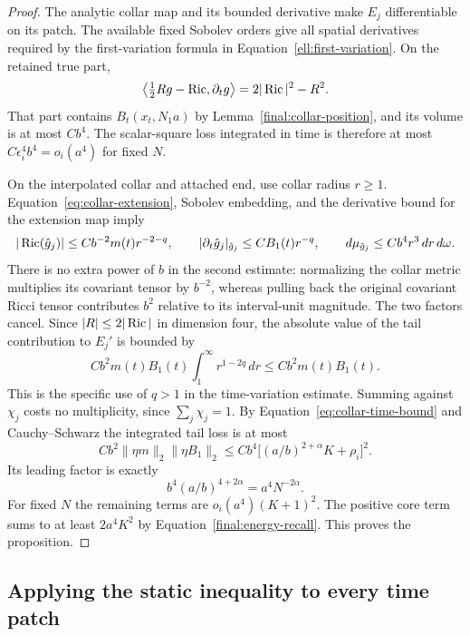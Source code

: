 \begin{proof}
The analytic collar map and its bounded derivative make $E_j$
differentiable on its patch.  The available fixed Sobolev orders
give all spatial derivatives required by the first-variation formula
in Equation~\eqref{ell:first-variation}.  On the retained true part,
\[
 \left\langle \tfrac12 Rg-\operatorname{Ric},\partial_tg\right\rangle
           =2|\operatorname{Ric}|^2-R^2.
\]
That part contains $B_t(x_t,N_1a)$ by
Lemma~\ref{final:collar-position}, and its volume is at most $Cb^4$.
The scalar-square loss integrated in time is therefore at most
$C\epsilon_i^4b^4=o_i(a^4)$ for fixed $N$.

On the interpolated collar and attached end, use collar radius
$r\ge1$.  Equation~\eqref{eq:collar-extension}, Sobolev embedding,
and the derivative bound for the extension map imply
\[
 |\operatorname{Ric}(\hat g_j)|\le Cb^{-2}m(t)r^{-2-q},\qquad
 |\partial_t\hat g_j|_{\hat g_j}\le CB_1(t)r^{-q},\qquad
 d\mu_{\hat g_j}\le Cb^4r^3\,dr\,d\omega.
\]
There is no extra power of $b$ in the second estimate: normalizing
the collar metric multiplies its covariant tensor by $b^{-2}$,
whereas pulling back the original covariant Ricci tensor contributes
$b^2$ relative to its interval-unit magnitude.  The two factors
cancel.  Since $|R|\le2|\operatorname{Ric}|$ in dimension four, the absolute value
of the tail contribution to $E_j'$ is bounded by
\begin{equation}\label{final:tail-variation}
 Cb^2m(t)B_1(t)\int_1^\infty r^{1-2q}\,dr
       \le Cb^2m(t)B_1(t).
\end{equation}
This is the specific use of $q>1$ in the time-variation estimate.
Summing against $\chi_j$ costs no multiplicity, since
$\sum_j\chi_j=1$.  By Equation~\eqref{eq:collar-time-bound} and
Cauchy--Schwarz the integrated tail loss is at most
\[
 Cb^2\|\eta m\|_2\|\eta B_1\|_2
 \le Cb^4\bigl[(a/b)^{2+\alpha}K+\rho_i\bigr]^2.
\]
Its leading factor is exactly
\begin{equation}\label{final:tail-scaling}
 b^4(a/b)^{4+2\alpha}=a^4N^{-2\alpha}.
\end{equation}
For fixed $N$ the remaining terms are
$o_i(a^4)(K+1)^2$.  The positive core term sums to at least
$2a^4K^2$ by Equation~\eqref{final:energy-recall}.  This proves the
proposition.
\end{proof}

\subsection{Applying the static inequality to every time patch}

